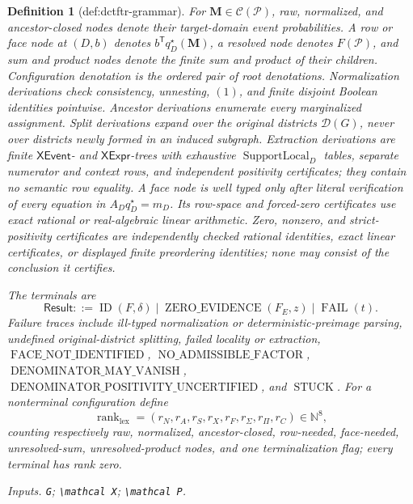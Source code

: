 \documentclass{article}
\newtheorem{definition}{Definition}
\begin{document}
\begin{definition}[def:dctftr-grammar]
For \(\mathbf M\in\mathcal C(\mathcal P)\), raw, normalized, and ancestor-closed nodes denote their target-domain event probabilities.  A row or face node at \((D,b)\) denotes \(b^{\mathsf T}q_D^\star(\mathbf M)\), a resolved node denotes \(F(\mathcal P)\), and sum and product nodes denote the finite sum and product of their children.  Configuration denotation is the ordered pair of root denotations.  Normalization derivations check consistency, unnesting, \((1)\), and finite disjoint Boolean identities pointwise.  Ancestor derivations enumerate every marginalized assignment.  Split derivations expand over the original districts \(\mathcal D(G)\), never over districts newly formed in an induced subgraph.  Extraction derivations are finite \(\mathsf{XEvent}\)- and \(\mathsf{XExpr}\)-trees with exhaustive \(\operatorname{SupportLocal}_D\) tables, separate numerator and context rows, and independent positivity certificates; they contain no semantic row equality.  A face node is well typed only after literal verification of every equation in \(A_Dq_D^\star=m_D\).  Its row-space and forced-zero certificates use exact rational or real-algebraic linear arithmetic.  Zero, nonzero, and strict-positivity certificates are independently checked rational identities, exact linear certificates, or displayed finite preordering identities; none may consist of the conclusion it certifies.

The terminals are
\[
\mathsf{Result}::=
\operatorname{ID}(F,\delta)
\mid\operatorname{ZERO\_EVIDENCE}(F_E,z)
\mid\operatorname{FAIL}(t).
\]
Failure traces include ill-typed normalization or deterministic-preimage parsing, undefined original-district splitting, failed locality or extraction, \(\operatorname{FACE\_NOT\_IDENTIFIED}\), \(\operatorname{NO\_ADMISSIBLE\_FACTOR}\), \(\operatorname{DENOMINATOR\_MAY\_VANISH}\), \(\operatorname{DENOMINATOR\_POSITIVITY\_UNCERTIFIED}\), and \(\operatorname{STUCK}\).  For a nonterminal configuration define
\[
\operatorname{rank}_{\mathrm{lex}}
=(r_N,r_A,r_S,r_X,r_F,r_\Sigma,r_\Pi,r_C)\in\mathbb N^8,
\]
counting respectively raw, normalized, ancestor-closed, row-needed, face-needed, unresolved-sum, unresolved-product nodes, and one terminalization flag; every terminal has rank zero.
\par\smallskip\noindent\emph{Inputs.} \texttt{G}; \texttt{\textbackslash{}\allowbreak{}mathcal X}; \texttt{\textbackslash{}\allowbreak{}mathcal P}.
\end{definition}
\end{document}
